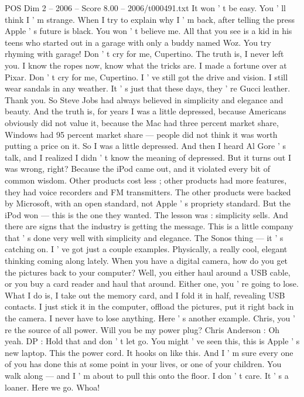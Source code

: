 \begin{textsample}{POS Dim 2 – 2006 – Score 8.00 – 2006/t000491.txt}
It won ' t be easy.
You ' ll think I ' m strange.
When I try to explain why I ' m back, after telling the press Apple ' s future is black.
You won ' t believe me.
All that you see is a kid in his teens who started out in a garage with only a buddy named Woz.
You try rhyming with garage!
Don ' t cry for me, Cupertino.
The truth is, I never left you.
I know the ropes now, know what the tricks are.
I made a fortune over at Pixar.
Don ' t cry for me, Cupertino.
I ' ve still got the drive and vision.
I still wear sandals in any weather.
It ' s just that these days, they ' re Gucci leather.
Thank you.
So Steve Jobs had always believed in simplicity and elegance and beauty.
And the truth is, for years I was a little depressed, because Americans obviously did not value it, because the Mac had three percent market share, Windows had 95 percent market share — people did not think it was worth putting a price on it.
So I was a little depressed.
And then I heard Al Gore ' s talk, and I realized I didn ' t know the meaning of depressed.
But it turns out I was wrong, right?
Because the iPod came out, and it violated every bit of common wisdom.
Other products cost less ; other products had more features, they had voice recorders and FM transmitters.
The other products were backed by Microsoft, with an open standard, not Apple ' s propriety standard.
But the iPod won — this is the one they wanted.
The lesson was : simplicity sells.
And there are signs that the industry is getting the message.
This is a little company that ' s done very well with simplicity and elegance.
The Sonos thing — it ' s catching on.
I ' ve got just a couple examples.
Physically, a really cool, elegant thinking coming along lately.
When you have a digital camera, how do you get the pictures back to your computer?
Well, you either haul around a USB cable, or you buy a card reader and haul that around.
Either one, you ' re going to lose.
What I do is, I take out the memory card, and I fold it in half, revealing USB contacts.
I just stick it in the computer, offload the pictures, put it right back in the camera.
I never have to lose anything.
Here ' s another example.
Chris, you ' re the source of all power.
Will you be my power plug?
Chris Anderson : Oh yeah.
DP : Hold that and don ' t let go.
You might ' ve seen this, this is Apple ' s new laptop.
This the power cord.
It hooks on like this.
And I ' m sure every one of you has done this at some point in your lives, or one of your children.
You walk along — and I ' m about to pull this onto the floor.
I don ' t care.
It ' s a loaner.
Here we go.
Whoa!

\end{textsample}
